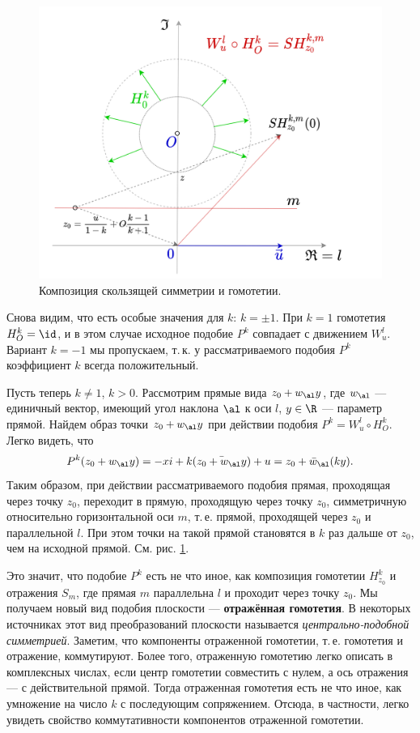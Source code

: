 \begin{enumerate}
\begin{figure}[hbt!]
\begin{center}
\includegraphics[scale=0.3]{SimHomot.png}
\end{center}\caption{Композиция скользящей симметрии и гомотетии.}\label{SimHomot}
\end{figure}

Снова видим, что есть особые значения для $k$: $k=\pm 1$. При $k=1$ гомотетия $H_O^k=\id$, и в этом случае исходное подобие $P^k$ совпадает с движением $W_u^l$. Вариант $k=-1$ мы пропускаем, т.\,к. у рассматриваемого подобия $P^k$ коэффициент $k$ всегда положительный.

Пусть теперь $k\ne 1$, $k>0$. Рассмотрим прямые вида $z_0+w_\al y$, где $w_\al$ --- единичный вектор, имеющий угол наклона $\al$ к оси $l$, $y\in\R$ --- параметр прямой. Найдем образ точки $z_0+w_\al y$ при действии подобия $P^k=W_u^l\circ H_O^k$. Легко видеть, что
$$
P^k(z_0+w_\al y) = -xi+k(\bar{z_0+w_\al y})+u = z_0+\bar w_\al(ky).
$$
Таким образом, при действии рассматриваемого подобия прямая, проходящая через точку $z_0$, переходит в прямую, проходящую через точку $z_0$, симметричную относительно горизонтальной оси $m$, т.\,е. прямой, проходящей через $z_0$ и параллельной $l$. При этом точки на такой прямой становятся в $k$ раз дальше от $z_0$, чем на исходной прямой. См. рис. \ref{SimHomot}.

Это значит, что подобие $P^k$ есть не что иное, как композиция гомотетии $H_{z_0}^k$ и отражения $S_m$, где прямая $m$ параллельна $l$ и проходит через точку $z_0$. Мы получаем новый вид подобия плоскости --- \textbf{отражённая гомотетия}. В некоторых источниках этот вид преобразований плоскости называется \textit{центрально-подобной симметрией}. Заметим, что компоненты отраженной гомотетии, т.\,е. гомотетия и отражение, коммутируют. Более того, отраженную гомотетию легко описать в комплексных числах, если центр гомотетии совместить с нулем, а ось отражения --- с действительной прямой. Тогда отраженная гомотетия есть не что иное, как умножение на число $k$ с последующим сопряжением. Отсюда, в частности, легко увидеть свойство коммутативности компонентов отраженной гомотетии.


\end{enumerate}
